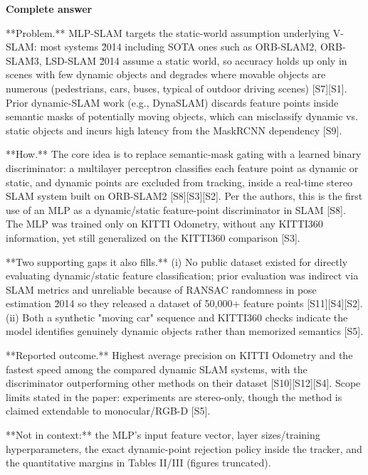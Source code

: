 \documentclass[10pt]{article}
\begin{document}
\textbf{Complete answer}
\begin{AnswerText}
**Problem.** MLP-SLAM targets the static-world assumption underlying V-SLAM: most systems \u2014 including SOTA ones such as ORB-SLAM2, ORB-SLAM3, LSD-SLAM \u2014 assume a static world, so accuracy holds up only in scenes with few dynamic objects and degrades where movable objects are numerous (pedestrians, cars, buses, typical of outdoor driving scenes) [S7][S1]. Prior dynamic-SLAM work (e.g., DynaSLAM) discards feature points inside semantic masks of potentially moving objects, which can misclassify dynamic vs. static objects and incurs high latency from the MaskRCNN dependency [S9].

**How.** The core idea is to replace semantic-mask gating with a learned binary discriminator: a multilayer perceptron classifies each feature point as dynamic or static, and dynamic points are excluded from tracking, inside a real-time stereo SLAM system built on ORB-SLAM2 [S8][S3][S2]. Per the authors, this is the first use of an MLP as a dynamic/static feature-point discriminator in SLAM [S8]. The MLP was trained only on KITTI Odometry, without any KITTI360 information, yet still generalized on the KITTI360 comparison [S3].

**Two supporting gaps it also fills.** (i) No public dataset existed for directly evaluating dynamic/static feature classification; prior evaluation was indirect via SLAM metrics and unreliable because of RANSAC randomness in pose estimation \u2014 so they released a dataset of 50,000+ feature points [S11][S4][S2]. (ii) Both a synthetic "moving car" sequence and KITTI360 checks indicate the model identifies genuinely dynamic objects rather than memorized semantics [S5].

**Reported outcome.** Highest average precision on KITTI Odometry and the fastest speed among the compared dynamic SLAM systems, with the discriminator outperforming other methods on their dataset [S10][S12][S4]. Scope limits stated in the paper: experiments are stereo-only, though the method is claimed extendable to monocular/RGB-D [S5].

**Not in context:** the MLP's input feature vector, layer sizes/training hyperparameters, the exact dynamic-point rejection policy inside the tracker, and the quantitative margins in Tables II/III (figures truncated).
\end{AnswerText}
\end{document}
